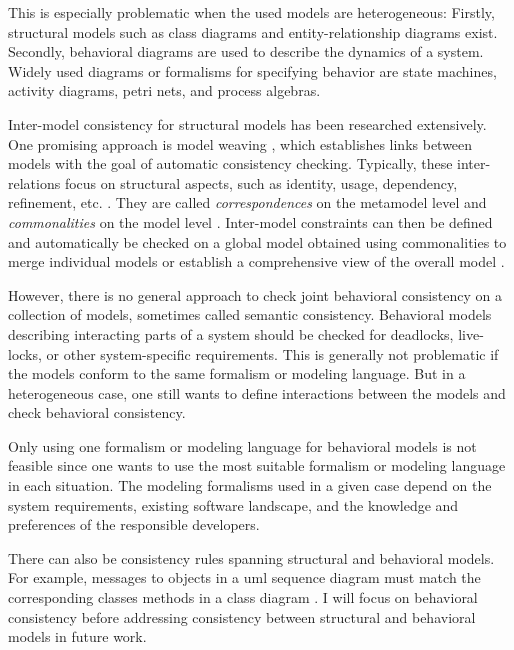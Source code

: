 \documentclass[conference]{IEEEtran}
\begin{document}
This is especially problematic when the used models are heterogeneous:
Firstly, structural models such as class diagrams and entity-relationship diagrams exist.
Secondly, behavioral diagrams are used to describe the dynamics of a system.
Widely used diagrams or formalisms for specifying behavior are state machines, activity diagrams, petri nets, and process algebras.

Inter-model consistency for structural models has been researched extensively.
One promising approach is model weaving \cite{bezivinCanonicalSchemeModel2006}, which establishes links between models with the goal of automatic consistency checking.
Typically, these inter-relations focus on structural aspects, such as identity, usage, dependency, refinement, etc. \cite{feldmannManagingIntermodelInconsistencies2019, torresSystematicLiteratureReview2020}.
They are called \textit{correspondences} on the metamodel level and \textit{commonalities} on the model level \cite{stunkelMultipleModelSynchronization2020, klareCommonalitiesPreservingConsistency2019}.
Inter-model constraints can then be defined and automatically be checked on a global model obtained using commonalities to merge individual models \cite{stunkelMultimodelCorrespondenceIntermodel2018} or establish a comprehensive view of the overall model \cite{stunkelMultipleModelSynchronization2020}.

However, there is no general approach to check joint behavioral consistency on a collection of models, sometimes called semantic consistency.
Behavioral models describing interacting parts of a system should be checked for deadlocks, live-locks, or other system-specific requirements.
This is generally not problematic if the models conform to the same formalism or modeling language.
But in a heterogeneous case, one still wants to define interactions between the models and check behavioral consistency.

Only using one formalism or modeling language for behavioral models is not feasible since one wants to use the most suitable formalism or modeling language in each situation.
The modeling formalisms used in a given case depend on the system requirements, existing software landscape, and the knowledge and preferences of the responsible developers. 

There can also be consistency rules spanning structural and behavioral models.
For example, messages to objects in a \gls{uml} sequence diagram must match the corresponding classes methods in a class diagram \cite{egyedFixingInconsistenciesUML2007}.
I will focus on behavioral consistency before addressing consistency between structural and behavioral models in future work. 
\end{document}
